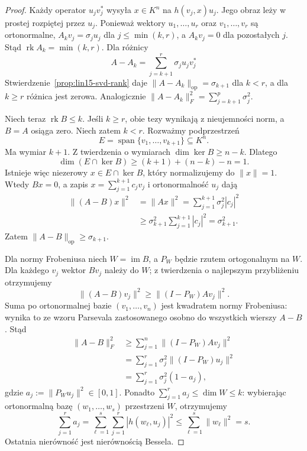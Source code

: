 \begin{proof}
Każdy operator
\(u_jv_j^*\) wysyła
\(x\in K^n\) na
\(h(v_j,x)u_j\).
Jego obraz leży
w prostej rozpiętej przez \(u_j\).
Ponieważ wektory \(u_1,\ldots,u_r\)
oraz \(v_1,\ldots,v_r\)
są ortonormalne,
\(A_kv_j=\sigma_j u_j\)
dla \(j\le\min(k,r)\),
a \(A_kv_j=0\) dla pozostałych \(j\).
Stąd
\(\operatorname{rk}A_k=\min(k,r)\).
Dla różnicy
\[
 A-A_k=\sum_{j=k+1}^{r}\sigma_j u_jv_j^*
\]
Stwierdzenie~\ref{prop:lin15-svd-rank}
daje
\(\|A-A_k\|_{\mathrm{op}}=\sigma_{k+1}\)
dla \(k<r\), a dla \(k\ge r\)
różnica jest zerowa.
Analogicznie
\(\|A-A_k\|_F^2=
\sum_{j=k+1}^p\sigma_j^2\).

Niech teraz \(\operatorname{rk}B\le k\).
Jeśli \(k\ge r\), obie tezy
wynikają z nieujemności norm,
a \(B=A\) osiąga zero.
Niech zatem \(k<r\).
Rozważmy podprzestrzeń
\[
 E=\operatorname{span}\{v_1,\ldots,v_{k+1}\}
 \subseteq K^n.
\]
Ma wymiar \(k+1\).
Z twierdzenia o wymiarach
\(\dim\ker B\ge n-k\).
Dlatego
\[
 \dim(E\cap\ker B)
 \ge (k+1)+(n-k)-n=1.
\]
Istnieje więc niezerowy
\(x\in E\cap\ker B\),
który normalizujemy do \(\|x\|=1\).
Wtedy \(Bx=0\),
a zapis \(x=\sum_{j=1}^{k+1}c_jv_j\)
i ortonormalność \(u_j\) dają
\[
 \begin{aligned}
 \|(A-B)x\|^2
 &=\|Ax\|^2
 =\sum_{j=1}^{k+1}\sigma_j^2|c_j|^2\\
 &\ge\sigma_{k+1}^2\sum_{j=1}^{k+1}|c_j|^2
 =\sigma_{k+1}^2.
 \end{aligned}
\]
Zatem
\(\|A-B\|_{\mathrm{op}}\ge\sigma_{k+1}\).

Dla normy Frobeniusa
niech \(W=\operatorname{im}B\),
a \(P_W\) będzie rzutem
ortogonalnym na \(W\).
Dla każdego \(v_j\)
wektor \(Bv_j\) należy do \(W\);
z twierdzenia o najlepszym
przybliżeniu otrzymujemy
\[
 \|(A-B)v_j\|^2
 \ge\|(I-P_W)Av_j\|^2.
\]
Suma po ortonormalnej bazie
\((v_1,\ldots,v_n)\)
jest kwadratem normy Frobeniusa:
wynika to ze wzoru Parsevala
zastosowanego osobno do
wszystkich wierszy \(A-B\).
Stąd
\[
 \begin{aligned}
 \|A-B\|_F^2
 &\ge\sum_{j=1}^n\|(I-P_W)Av_j\|^2\\
 &=\sum_{j=1}^r
    \sigma_j^2\|(I-P_W)u_j\|^2\\
 &=\sum_{j=1}^r\sigma_j^2(1-a_j),
 \end{aligned}
\]
gdzie
\(a_j:=\|P_Wu_j\|^2\in[0,1]\).
Ponadto
\(\sum_{j=1}^r a_j\le\dim W\le k\):
wybierając ortonormalną bazę
\((w_1,\ldots,w_s)\) przestrzeni \(W\),
otrzymujemy
\[
 \sum_{j=1}^r a_j
 =\sum_{\ell=1}^s\sum_{j=1}^r
        |h(w_\ell,u_j)|^2
 \le\sum_{\ell=1}^s\|w_\ell\|^2=s.
\]
Ostatnia nierówność jest
nierównością Bessela.


\end{proof}

